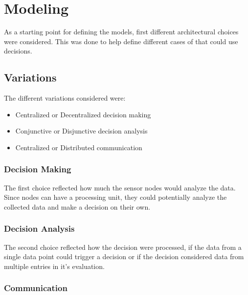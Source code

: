 


\section{Modeling}


As a starting point for defining the models, first different architectural choices were considered. This was done to help define different cases of \wsn that could use decisions. 

\subsection{Variations}

The different variations considered were: \\

\begin{itemize}
\item Centralized or Decentralized decision making
\item Conjunctive or Disjunctive decision analysis
\item Centralized or Distributed communication
\end{itemize}

\subsubsection{Decision Making}

The first choice reflected how much the sensor nodes would analyze the data. Since nodes can have a processing unit, they could potentially analyze the collected data and make a decision on their own. 

\subsubsection{Decision Analysis}
The second choice reflected how the decision were processed, if the data from a single data point could trigger a decision or if the decision considered data from multiple entries in it's evaluation.

\subsubsection{Communication}

